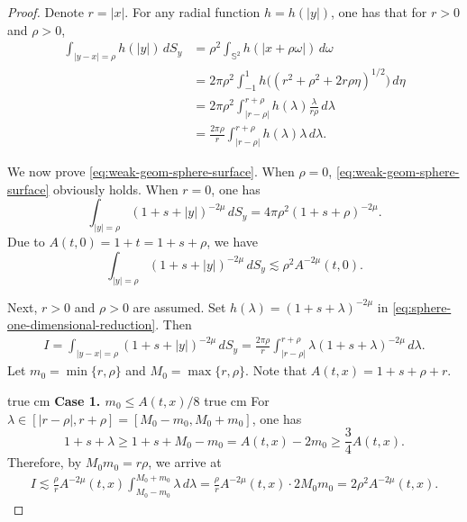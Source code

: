 \documentclass[11pt,twoside]{article}
\theoremstyle{plain}
\theoremstyle{definition}
\theoremstyle{assumption}
\numberwithin{equation}{section}
\begin{document}
			\begin{proof}
				Denote $r = |x|$. For any radial function \(h=h(|y|)\), one has
that for  \(r>0\) and \(\rho>0\),
				\begin{equation}\label{eq:sphere-one-dimensional-reduction}
					\begin{aligned}
						\int_{|y-x|=\rho} h(|y|)\,dS_y
						&=
						\rho^2\int_{\mathbb S^2} h(|x+\rho\omega|)\,d\omega  \\
						&=
						2\pi\rho^2
						\int_{-1}^1
						h\!\big((r^2+\rho^2+2r\rho\eta)^{1/2}\big)\,d\eta  \\
						&=
						2\pi\rho^2
						\int_{|r-\rho|}^{r+\rho}
						h(\lambda)\frac{\lambda}{r\rho}\,d\lambda  \\
						&=
						\frac{2\pi\rho}{r}
						\int_{|r-\rho|}^{r+\rho} h(\lambda)\lambda\,d\lambda .
					\end{aligned}
				\end{equation}
				
				We now prove \eqref{eq:weak-geom-sphere-surface}. When \(\rho=0\), \eqref{eq:weak-geom-sphere-surface}
obviously holds. When \(r=0\), one has
				\[
				\int_{|y|=\rho}
				(1+s+|y|)^{-2\mu}\,dS_y
				=
				4\pi\rho^2(1+s+\rho)^{-2\mu}.
				\]
				Due to $A(t,0)=1+t=1+s+\rho$,
				we have
				\[
				\int_{|y|=\rho}
				(1+s+|y|)^{-2\mu}\,dS_y
				\lesssim
				\rho^2 A^{-2\mu}(t,0).
				\]
				
Next,  \(r>0\) and \(\rho>0\) are assumed. Set $h(\lambda)=(1+s+\lambda)^{-2\mu}$ in \eqref{eq:sphere-one-dimensional-reduction}.
				Then
				\begin{equation}
					\label{eq:weak-I-definition}
					\begin{aligned}
						I=
						\int_{|y-x|=\rho}
						(1+s+|y|)^{-2\mu}\,dS_y
						=
						\frac{2\pi\rho}{r}
						\int_{|r-\rho|}^{r+\rho}
						\lambda(1+s+\lambda)^{-2\mu}\,d\lambda .
					\end{aligned}
				\end{equation}
				Let $m_0=\min\{r,\rho\}$ and $M_0=\max\{r,\rho\}$.
				Note that $A(t,x)=1+s+\rho+r$.
				
				
				 true cm
				\noindent
				\textbf{Case 1. \(m_0\le A(t,x)/8\)}
 true cm
				For $\lambda\in[|r-\rho|,r+\rho]=[M_0-m_0,M_0+m_0]$, one has
				\[
				1+s+\lambda
				\ge
				1+s+M_0-m_0
				=
				A(t,x)-2m_0
				\ge
				\frac34A(t,x).
				\]
				Therefore, by \(M_0m_0=r\rho\), we arrive at
				\begin{equation}
					\label{eq:weak-geom-small-min-surface}
					\begin{aligned}
						I
						\lesssim
						\frac{\rho}{r}
						A^{-2\mu}(t,x)
						\int_{M_0-m_0}^{M_0+m_0}
						\lambda\,d\lambda
						=
						\frac{\rho}{r}
						A^{-2\mu}(t,x)
						\cdot 2M_0m_0
						=
						2\rho^2A^{-2\mu}(t,x).
					\end{aligned}
				\end{equation}
				

\end{proof}
\end{document}
